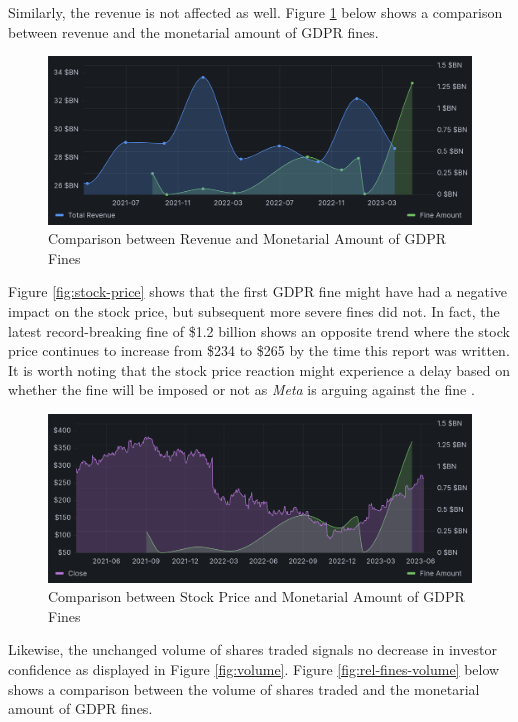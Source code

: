 \documentclass[12pt, a4paper]{article}
\begin{document}
Similarly, the revenue is not affected as well. Figure
\ref{fig:rel-fines-revenue} below shows a comparison between revenue and the
monetarial amount of GDPR fines.

\begin{figure}[H]
    \centering
    \includegraphics[width=1.00\textwidth]{rel-fines-revenue}
    \caption{Comparison between Revenue and Monetarial Amount of GDPR Fines}
    \label{fig:rel-fines-revenue}
\end{figure}

Figure \ref{fig:stock-price} shows that the first GDPR fine might have had a
negative impact on the stock price, but subsequent more severe fines did not. In
fact, the latest record-breaking fine of \$1.2 billion shows an opposite trend
where the stock price continues to increase from \$234 to \$265 by the time this
report was written. It is worth noting that the stock price reaction might
experience a delay based on whether the fine will be imposed or not as
\textit{Meta} is arguing against the fine \cite{metaArgueFine}.

\begin{figure}[H]
    \centering
    \includegraphics[width=1.00\textwidth]{rel-fines-stock-price}
    \caption{Comparison between Stock Price and Monetarial Amount of GDPR Fines}
    \label{fig:rel-stock-price}
\end{figure}

Likewise, the unchanged volume of shares traded signals no decrease in investor
confidence as displayed in Figure \ref{fig:volume}. Figure
\ref{fig:rel-fines-volume} below shows a comparison between the volume of shares
traded and the monetarial amount of GDPR fines.
\end{document}
